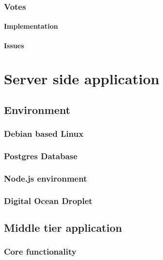 \subsubsection*{Votes}

\paragraph*{Implementation}

\paragraph*{Issues}



\section{Server side application}


\subsection{Environment}

\subsubsection{Debian based Linux}

\subsubsection{Postgres Database}

\subsubsection{Node.js environment}

\subsubsection{Digital Ocean Droplet}



\subsection{Middle tier application}

\subsubsection{Core functionality}

